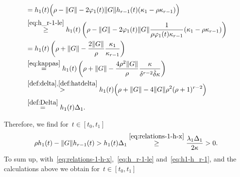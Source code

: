 \documentclass[ envcountsect, envcountsame]{svjour3}
\newcommand{\vp}{\varphi}
\begin{document}
\begin{small}
\begin{align*}
& = h_1(t) \Big( \rho - \|G\| - 2\vp_1(t) \|G\|h_{r-1}(t) ( \kappa_1 - \rho  \kappa_{r-1}) \Big) \\
& \overset{\eqref{eq:h_r-1-le}}{\ge}  h_1(t) \left( \rho - \|G\| - 2\vp_1(t) \|G\|\frac{1}{\rho \vp_1(t)  \kappa_{r-1}}( \kappa_1 - \rho  \kappa_{r-1}) \right) \\
& = h_1(t) \left( \rho + \|G\| - \frac{2 \|G\|}{\rho} \frac{\kappa_1}{\kappa_{r-1}} \right) \\
& \overset{\eqref{eq:kappas}}{=} h_1(t) \left( \rho + \|G\| - \frac{4 \rho^2 \|G\|}{\rho} \frac{ \kappa}{  \delta^{r-2} \hat \delta \kappa} \right) \\
& \overset{\eqref{def:delta},\eqref{def:hatdelta}}{>} h_1(t) \Big( \rho + \|G\| - 4 \|G\| \rho^2 (\rho+1)^{r-2} \Big) \\
& \overset{\eqref{def:Delta}}{=} h_1(t) \Delta_1 .
%
\end{align*}
\end{small}
%
Therefore, we find for~$t \in [t_0,t_1]$
\begin{equation} \label{eq:h1-h_r-1}
\rho h_1(t) - \|G\| h_{r-1}(t) > h_1(t) \Delta_1 \overset{\eqref{eq:relations-1-h-x}}{\ge} \frac{\lambda_1 \Delta_1}{2 \kappa} > 0 .
%
\end{equation}
%
%
To sum up, with~\eqref{eq:relations-1-h-x},~\eqref{eq:h_r-1-le} and~\eqref{eq:h1-h_r-1}, and the calculations above we obtain for~${t\in[t_0,t_1]}$
\end{document}
